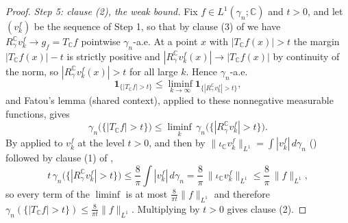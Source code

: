 \begin{proof}
\emph{Step 5: clause (2), the weak bound.}
Fix $f \in L^1(\gamma_n;\mathbb{C})$ and $t > 0$, and let $(v^f_k)$ be the
sequence of Step 1, so that by clause (3) of  we
have $R_\gamma^{\mathbb{C}} v^f_k \to g_f = T_{\mathbb{C}}f$ pointwise
$\gamma_n$-a.e.  At a point $x$ with $|T_{\mathbb{C}}f(x)| > t$ the margin
$|T_{\mathbb{C}}f(x)| - t$ is strictly positive and
$|R_\gamma^{\mathbb{C}} v^f_k(x)| \to |T_{\mathbb{C}}f(x)|$ by continuity of the
norm, so $|R_\gamma^{\mathbb{C}} v^f_k(x)| > t$ for all large $k$.  Hence
$\gamma_n$-a.e.
\[
  \mathbf{1}_{\{|T_{\mathbb{C}}f| > t\}}
    \leq \liminf_{k\to\infty}\mathbf{1}_{\{|R_\gamma^{\mathbb{C}} v^f_k| > t\}} ,
\]
and Fatou's lemma (shared context), applied to these nonnegative measurable
functions, gives
\[
  \gamma_n\bigl(\{|T_{\mathbb{C}}f| > t\}\bigr)
    \leq \liminf_{k}\,
      \gamma_n\bigl(\{|R_\gamma^{\mathbb{C}} v^f_k| > t\}\bigr) .
\]
By  applied to $v^f_k$ at the level $t > 0$, and then
by $\|\iota_{\mathbb{C}} v^f_k\|_{L^1} = \int |v^f_k| \, d\gamma_n$
() followed by clause (1) of
,
\[
  t\,\gamma_n\bigl(\{|R_\gamma^{\mathbb{C}} v^f_k| > t\}\bigr)
    \leq \frac{8}{\pi}\int |v^f_k| \, d\gamma_n
    = \frac{8}{\pi}\,\|\iota_{\mathbb{C}} v^f_k\|_{L^1}
    \leq \frac{8}{\pi}\,\|f\|_{L^1} ,
\]
so every term of the $\liminf$ is at most $\tfrac{8}{\pi t}\|f\|_{L^1}$ and
therefore
$\gamma_n(\{|T_{\mathbb{C}}f| > t\}) \leq \tfrac{8}{\pi t}\|f\|_{L^1}$.
Multiplying by $t > 0$ gives clause (2).
\end{proof}
